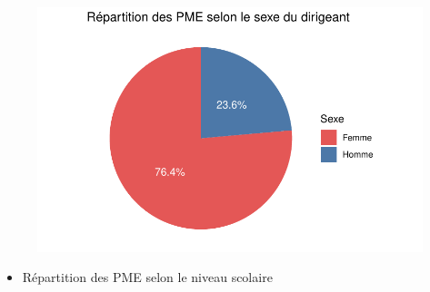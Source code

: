 \documentclass[
  letterpaper,
  DIV=11,
  numbers=noendperiod]{scrartcl}
\providecommand{\tightlist}{%
  \setlength{\itemsep}{0pt}\setlength{\parskip}{0pt}}\usepackage{longtable,booktabs,array}
\begin{document}
\begin{figure}[H]

{\centering \includegraphics{projet_R_files/figure-pdf/unnamed-chunk-20-1.pdf}

}

\end{figure}

\begin{itemize}
\tightlist
\item
  Répartition des PME selon le niveau scolaire
\end{itemize}
\end{document}
